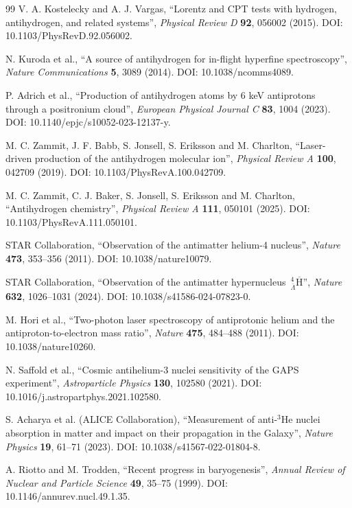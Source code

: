 \documentclass[11pt,a4paper]{article}
\begin{document}
\begin{thebibliography}{99}
V. A. Kostelecky and A. J. Vargas, \enquote{Lorentz and CPT tests with hydrogen, antihydrogen, and related systems}, \emph{Physical Review D} \textbf{92}, 056002 (2015). DOI: 10.1103/PhysRevD.92.056002.

N. Kuroda et al., \enquote{A source of antihydrogen for in-flight hyperfine spectroscopy}, \emph{Nature Communications} \textbf{5}, 3089 (2014). DOI: 10.1038/ncomms4089.

P. Adrich et al., \enquote{Production of antihydrogen atoms by 6 keV antiprotons through a positronium cloud}, \emph{European Physical Journal C} \textbf{83}, 1004 (2023). DOI: 10.1140/epjc/s10052-023-12137-y.

M. C. Zammit, J. F. Babb, S. Jonsell, S. Eriksson and M. Charlton, \enquote{Laser-driven production of the antihydrogen molecular ion}, \emph{Physical Review A} \textbf{100}, 042709 (2019). DOI: 10.1103/PhysRevA.100.042709.

M. C. Zammit, C. J. Baker, S. Jonsell, S. Eriksson and M. Charlton, \enquote{Antihydrogen chemistry}, \emph{Physical Review A} \textbf{111}, 050101 (2025). DOI: 10.1103/PhysRevA.111.050101.

STAR Collaboration, \enquote{Observation of the antimatter helium-4 nucleus}, \emph{Nature} \textbf{473}, 353--356 (2011). DOI: 10.1038/nature10079.

STAR Collaboration, \enquote{Observation of the antimatter hypernucleus $\,{}_{\bar\Lambda}^{4}\overline{\mathrm{H}}$}, \emph{Nature} \textbf{632}, 1026--1031 (2024). DOI: 10.1038/s41586-024-07823-0.

M. Hori et al., \enquote{Two-photon laser spectroscopy of antiprotonic helium and the antiproton-to-electron mass ratio}, \emph{Nature} \textbf{475}, 484--488 (2011). DOI: 10.1038/nature10260.

N. Saffold et al., \enquote{Cosmic antihelium-3 nuclei sensitivity of the GAPS experiment}, \emph{Astroparticle Physics} \textbf{130}, 102580 (2021). DOI: 10.1016/j.astropartphys.2021.102580.

S. Acharya et al. (ALICE Collaboration), \enquote{Measurement of anti-$^{3}$He nuclei absorption in matter and impact on their propagation in the Galaxy}, \emph{Nature Physics} \textbf{19}, 61--71 (2023). DOI: 10.1038/s41567-022-01804-8.

A. Riotto and M. Trodden, \enquote{Recent progress in baryogenesis}, \emph{Annual Review of Nuclear and Particle Science} \textbf{49}, 35--75 (1999). DOI: 10.1146/annurev.nucl.49.1.35.


\end{thebibliography}
\end{document}
